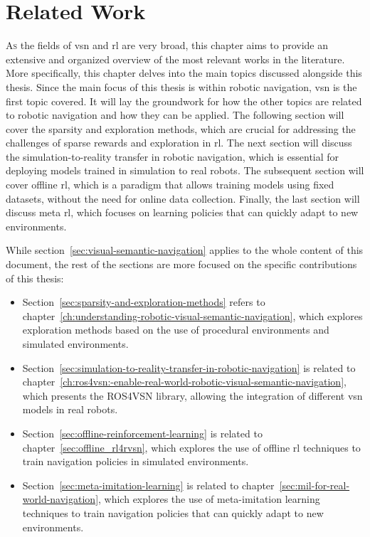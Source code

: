 \chapter{Related Work}\label{ch:related-work}

\lettrine{\textcolor{accent_color}{A}}{s} the fields of \acrlong{vsn} and \acrshort{rl} are very broad, this chapter aims to provide an extensive and organized overview of the most relevant works in the literature.
More specifically, this chapter delves into the main topics discussed alongside this thesis.
Since the main focus of this thesis is within robotic navigation, \acrshort{vsn} is the first topic covered.
It will lay the groundwork for how the other topics are related to robotic navigation and how they can be applied.
The following section will cover the sparsity and exploration methods, which are crucial for addressing the challenges of sparse rewards and exploration in \acrshort{rl}.
The next section will discuss the simulation-to-reality transfer in robotic navigation, which is essential for deploying models trained in simulation to real robots.
The subsequent section will cover offline \acrshort{rl}, which is a paradigm that allows training models using fixed datasets, without the need for online data collection.
Finally, the last section will discuss meta \acrshort{rl}, which focuses on learning policies that can quickly adapt to new environments.

While section~\ref{sec:visual-semantic-navigation} applies to the whole content of this document, the rest of the sections are more focused on the specific contributions of this thesis:

\begin{itemize}
    \item Section~\ref{sec:sparsity-and-exploration-methods} refers to chapter~\ref{ch:understanding-robotic-visual-semantic-navigation}, which explores exploration methods based on the use of procedural environments and simulated environments.
    \item Section~\ref{sec:simulation-to-reality-transfer-in-robotic-navigation} is related to chapter~\ref{ch:ros4vsn:-enable-real-world-robotic-visual-semantic-navigation}, which presents the ROS4VSN library, allowing the integration of different \acrshort{vsn} models in real robots.
    \item Section~\ref{sec:offline-reinforcement-learning} is related to chapter~\ref{sec:offline_rl4rvsn}, which explores the use of offline \acrshort{rl} techniques to train navigation policies in simulated environments.
    \item Section~\ref{sec:meta-imitation-learning} is related to chapter~\ref{sec:mil-for-real-world-navigation}, which explores the use of meta-imitation learning techniques to train navigation policies that can quickly adapt to new environments.
\end{itemize}

